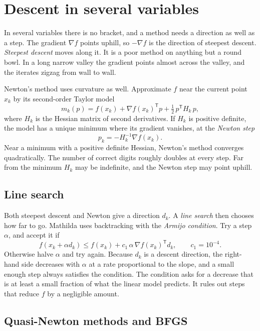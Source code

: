 \section{Descent in several variables}
\label{sec:opt-descent}

In several variables there is no bracket, and a method needs a direction as well
as a step. The gradient \(\nabla f\) points uphill, so \(-\nabla f\) is the
direction of steepest descent. \emph{Steepest descent} moves along it. It is a
poor method on anything but a round bowl. In a long narrow valley the gradient
points almost across the valley, and the iterates zigzag from wall to wall.

Newton's method uses curvature as well. Approximate \(f\) near the current
point \(x_k\) by its second-order Taylor model
\[
  m_k(p) = f(x_k) + \nabla f(x_k)^{\mathsf T} p + \tfrac12\, p^{\mathsf T} H_k\, p ,
\]
where \(H_k\) is the Hessian matrix of second derivatives. If \(H_k\) is
positive definite, the model has a unique minimum where its gradient vanishes,
at the \emph{Newton step}
\[
  p_k = -H_k^{-1} \nabla f(x_k).
\]
Near a minimum with a positive definite Hessian, Newton's method converges
quadratically. The number of correct digits roughly doubles at every step. Far
from the minimum \(H_k\) may be indefinite, and the Newton step may point
uphill.

\subsection{Line search}

Both steepest descent and Newton give a direction \(d_k\). A \emph{line
search} then chooses how far to go. Mathilda uses
backtracking with the \emph{Armijo condition}. Try a
step \(\alpha\), and accept it if
\[
  f(x_k + \alpha d_k) \le f(x_k) + c_1\, \alpha\, \nabla f(x_k)^{\mathsf T} d_k ,
  \qquad c_1 = 10^{-4}.
\]
Otherwise halve \(\alpha\) and try again. Because \(d_k\) is a descent
direction, the right-hand side decreases with \(\alpha\) at a rate proportional
to the slope, and a small enough step always satisfies the condition. The
condition asks for a decrease that is at least a small fraction of what the
linear model predicts. It rules out steps that reduce \(f\) by a negligible
amount.

\subsection{Quasi-Newton methods and BFGS}

